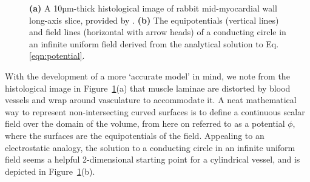 	\begin{figure}[htbp]
		\centering
		\qquad
    \caption{\textbf{(a)} A 10µm-thick histological image of rabbit mid-myocardial wall long-axis slice, provided by \cite{Burton2006}. \textbf{(b)} The equipotentials (vertical lines) and field lines (horizontal with arrow heads) of a conducting circle in an infinite uniform field derived from the analytical solution to Eq. \ref{eqn:potential}.}
	  \label{fig:vessel}
	\end{figure}
  
  With the development of a more `accurate model' in mind, we note from the histological image in Figure~\ref{fig:vessel}(a) that muscle laminae are distorted by blood vessels and wrap around vasculature to accommodate it. A neat mathematical way to represent non-intersecting curved surfaces is to define a continuous scalar field over the domain of the volume, from here on referred to as a potential $\phi$, where the surfaces are the equipotentials of the field. Appealing to an electrostatic analogy, the solution to a conducting circle in an infinite uniform field seems a helpful 2-dimensional starting point for a cylindrical vessel, and is depicted in Figure~\ref{fig:vessel}(b).
  
